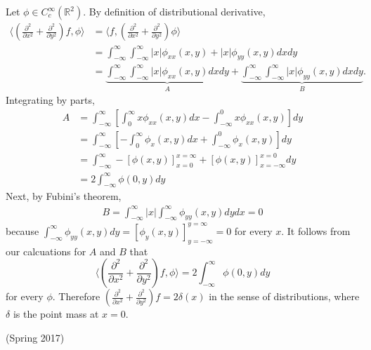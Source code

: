\documentclass[answers]{exam}
\theoremstyle{problemstyle}
\newcommand{\1}[1]{\textbf{1}_{\left[#1\right]}} %
\def\R{\mathbb{R}} %
\begin{document}
\begin{questions}
\begin{solution}
  Let $\phi\in C_{c}^{\infty}(\R^{2})$. By definition of distributional derivative, 
  \begin{align*}
    \Big\langle  \left( \frac{\partial ^{2}}{\partial x^{2}}+ \frac{\partial ^{2}}{\partial y^{2}} \right)f, \phi\Big\rangle
    &= \Big\langle f, \left(\frac{\partial ^{2}}{\partial x^{2}}+ \frac{\partial ^{2}}{\partial y^{2}} \right) \phi \Big\rangle\\ 
    &= \int_{-\infty}^{\infty}\int_{-\infty}^{\infty}|x| \phi_{xx}(x,y)+ |x|\phi_{yy}(x,y)dxdy\\
    &= \underbrace{\int_{-\infty}^{\infty}\int_{-\infty}^{\infty}|x| \phi_{xx}(x,y)dxdy}_{A}+ \underbrace{\int_{-\infty}^{\infty}\int_{-\infty}^{\infty}|x|\phi_{yy}(x,y)dxdy}_{B}.
  \end{align*}
  Integrating by parts,
  \begin{align*}
    A&= \int_{-\infty}^{\infty}\left[\int_{0}^{\infty}x \phi_{xx}(x,y)dx - \int_{-\infty}^{0}x\phi_{xx}(x,y)\right]dy\\
     &= \int_{-\infty}^{\infty}\left[-\int_{0}^{\infty}\phi_{x}(x,y)dx + \int_{-\infty}^{0}\phi_{x}(x,y)\right]dy\\
     &= \int_{-\infty}^{\infty} -\left[ \phi(x,y) \right]^{x=\infty}_{x=0}+ \left[ \phi(x,y) \right]^{x=0}_{x=-\infty}dy\\
     &=2\int_{-\infty}^{\infty}\phi(0,y)dy
  \end{align*}
  Next, by Fubini's theorem,
  \begin{align*}
    B= \int_{-\infty}^{\infty}|x|\int_{-\infty}^{\infty}\phi_{yy}(x,y)dydx = 0
  \end{align*}
  because $\int_{-\infty}^{\infty}\phi_{yy}(x,y)dy = \left[ \phi_{y}(x,y) \right]^{y=\infty}_{y=-\infty}= 0$ for every $x$. It follows from our calcuations for $A$ and $B$ that
  \begin{equation*}
    \Big\langle  \left( \frac{\partial ^{2}}{\partial x^{2}}+ \frac{\partial ^{2}}{\partial y^{2}} \right)f, \phi\Big\rangle = 2\int_{-\infty}^{\infty}\phi(0,y)dy
  \end{equation*}
  for every $\phi$. Therefore $\left( \frac{\partial ^{2}}{\partial x^{2}}+ \frac{\partial ^{2}}{\partial y^{2}} \right)f= 2\delta(x)$ in the sense of distributions, where $\delta$ is the point mass at $x=0$.
\end{solution} 


\question (Spring 2017)
\begin{parts}

\end{parts}
\end{questions}
\end{document}
